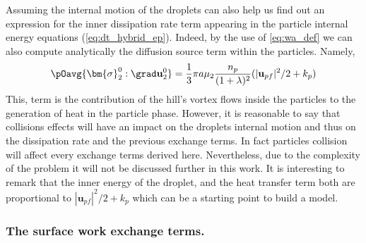 Assuming the internal motion of the droplets can also help us find out an expression for the inner dissipation rate term appearing in the particle internal energy equations (\ref{eq:dt_hybrid_ep}). 
Indeed, by the use of \ref{eq:wa_def} we can also compute analytically the diffusion source term within the particles. 
Namely, 
\begin{equation*}
    \pOavg{\bm{\sigma}_2^0:\grad \textbf{u}_2^0}
    = \frac{1}{3}\pi a  \mu_2
    \frac{n_p}{(1+\lambda)^2}
    (|\textbf{u}_{p f}|^2 /2  
    +  k_p)
\end{equation*}
This, term is the contribution of the hill's vortex flows inside the particles to the generation of heat in the particle phase. 
However, it is reasonable to say that collisions effects will have an impact on the droplets internal motion and thus on the dissipation rate and the previous exchange terms. 
In fact particles collision will affect every exchange terms derived here. 
Nevertheless, due to the complexity of the problem it will not be discussed further in this work.
It is interesting to remark that the inner energy of the droplet, and the heat transfer term both are proportional to $|\textbf{u}_{p f}|^2 /2  
+  k_p$ which can be a starting point to build a model. 

\subsubsection*{The surface work exchange terms.}


